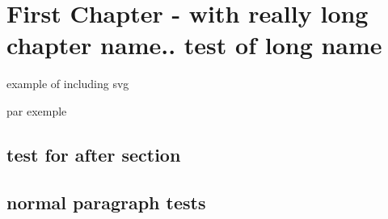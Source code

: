 \chapter{First Chapter - with really long chapter name.. test of long name}

example of including svg
\begin{figure}
\begin{minipage}{\dimexpr\linewidth/2\relax}
%
%
\end{minipage}%
\end{figure}



\pagebreak
\begin{paragraph}[color=red,size=\tiny][V][oico]
par exemple
\blindtext
\bfseries{\blindtext}
\end{paragraph}
\begin{paragraph}[background=orange,headingColor=blue,heading=should overide lettrine needs warning,headingStyle=\slshape][U][seless]
\blindtext
\end{paragraph}
\begin{paragraph}[background=blue]
\blindtext
\end{paragraph}
\section{test for after section}
\begin{paragraph}[][T][est]
\blindtext
\end{paragraph}
\begin{paragraph}
\blindtext
\end{paragraph}
\begin{paragraph}[heading=should cause a line skip]
\blindtext
\end{paragraph}
\section{normal paragraph tests}
\blindtext

\blindtext

\blindtext

\blindtext